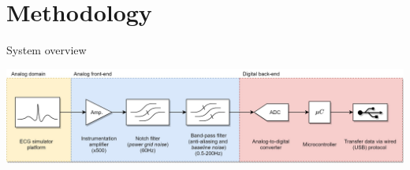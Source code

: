 \section{Methodology}

\begin{frame}{System overview}
\begin{center}
    \includegraphics[width=\textwidth]{images/diagram.jpg}  
\end{center}
\end{frame}



